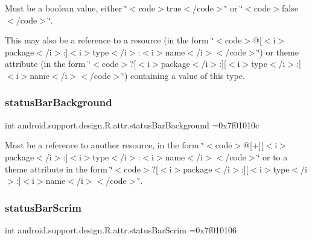Must be a boolean value, either \char`\"{}$<$code$>$true$<$/code$>$\char`\"{} or \char`\"{}$<$code$>$false$<$/code$>$\char`\"{}. 

This may also be a reference to a resource (in the form \char`\"{}$<$code$>$@\mbox{[}$<$i$>$package$<$/i$>$\+:\mbox{]}$<$i$>$type$<$/i$>$\+:$<$i$>$name$<$/i$>$$<$/code$>$\char`\"{}) or theme attribute (in the form \char`\"{}$<$code$>$?\mbox{[}$<$i$>$package$<$/i$>$\+:\mbox{]}\mbox{[}$<$i$>$type$<$/i$>$\+:\mbox{]}$<$i$>$name$<$/i$>$$<$/code$>$\char`\"{}) containing a value of this type. \mbox{\label{classandroid_1_1support_1_1design_1_1R_1_1attr_a60b91d21d0adc859faed1dfaa213521a}} 
\subsubsection{\texorpdfstring{status\+Bar\+Background}{statusBarBackground}}
{\footnotesize\ttfamily int android.\+support.\+design.\+R.\+attr.\+status\+Bar\+Background =0x7f01010c\hspace{0.3cm}{\ttfamily [static]}}

Must be a reference to another resource, in the form \char`\"{}$<$code$>$@\mbox{[}+\mbox{]}\mbox{[}$<$i$>$package$<$/i$>$\+:\mbox{]}$<$i$>$type$<$/i$>$\+:$<$i$>$name$<$/i$>$$<$/code$>$\char`\"{} or to a theme attribute in the form \char`\"{}$<$code$>$?\mbox{[}$<$i$>$package$<$/i$>$\+:\mbox{]}\mbox{[}$<$i$>$type$<$/i$>$\+:\mbox{]}$<$i$>$name$<$/i$>$$<$/code$>$\char`\"{}. \mbox{\label{classandroid_1_1support_1_1design_1_1R_1_1attr_a676b0bc448d5a54602f309542f409713}} 
\subsubsection{\texorpdfstring{status\+Bar\+Scrim}{statusBarScrim}}
{\footnotesize\ttfamily int android.\+support.\+design.\+R.\+attr.\+status\+Bar\+Scrim =0x7f010106\hspace{0.3cm}{\ttfamily [static]}}

